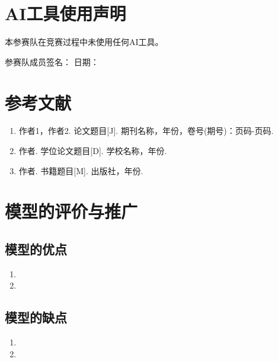 \documentclass[a4paper,12pt]{article}
\begin{document}
	\section*{AI工具使用声明}
	
	
	本参赛队在竞赛过程中未使用任何AI工具。
	
	
	\vspace{1cm}
	\noindent 参赛队成员签名：\hspace{3cm} 日期：\hspace{3cm}
	
	\newpage
	
	\section{参考文献}
	
	\begin{enumerate}
		\item 作者1，作者2. 论文题目[J]. 期刊名称，年份，卷号(期号)：页码-页码.
		\item 作者. 学位论文题目[D]. 学校名称，年份.
		\item 作者. 书籍题目[M]. 出版社，年份.
	\end{enumerate}
	
	\newpage
	
	\section{模型的评价与推广}
	
	\subsection{模型的优点}
	\begin{enumerate}
		\item [优点1]
		\item [优点2]
	\end{enumerate}
	
	\subsection{模型的缺点}
	\begin{enumerate}
		\item [缺点1]
		\item [缺点2]
	\end{enumerate}
	
\end{document}
